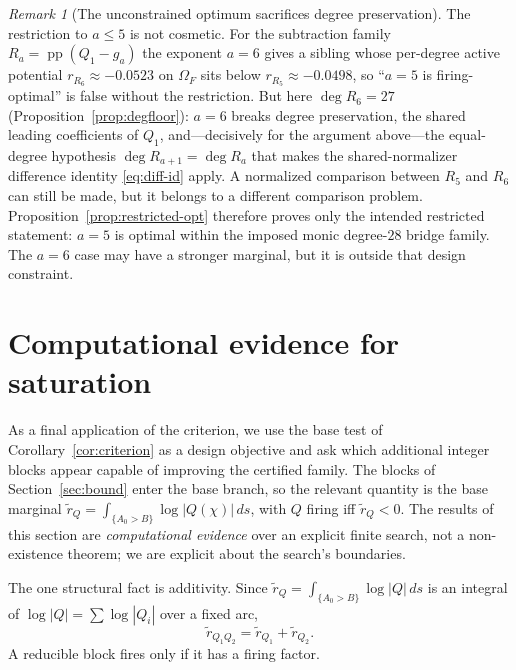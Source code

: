 \documentclass[11pt,reqno]{amsart}
\theoremstyle{plain}
\theoremstyle{definition}
\theoremstyle{remark}
\newtheorem{remark}[theorem]{Remark}
\DeclareMathOperator{\pp}{pp}
\newcommand{\rb}[1]{r_{#1}}   %
\begin{document}
\begin{remark}[The unconstrained optimum sacrifices degree preservation]
\label{rem:a6}
The restriction to $a\le5$ is not cosmetic. For the subtraction family
$R_a=\pp(Q_1-g_a)$ the exponent $a=6$ gives a sibling whose per-degree active potential
$\rb{R_6}\approx-0.0523$ on $\Omega_F$ sits below $\rb{R_5}\approx-0.0498$, so ``$a=5$ is
firing-optimal'' is false without the restriction. But here
$\deg R_6=27$ (Proposition~\ref{prop:degfloor}): $a=6$ breaks degree preservation, the
shared leading coefficients of $Q_1$, and---decisively for the argument
above---the equal-degree hypothesis $\deg R_{a+1}=\deg R_a$ that makes the
shared-normalizer difference identity \eqref{eq:diff-id} apply.  A normalized comparison
between $R_5$ and $R_6$ can still be made, but it belongs to a different comparison
problem.  Proposition~\ref{prop:restricted-opt} therefore proves only the intended
restricted statement: $a=5$ is optimal within the imposed monic degree-$28$ bridge
family.  The $a=6$ case may have a stronger marginal, but it is outside that design
constraint.
\end{remark}

\section{Computational evidence for saturation}\label{sec:saturation}

As a final application of the criterion, we use the base test of
Corollary~\ref{cor:criterion} as a design objective and ask which additional integer
blocks appear capable of improving the certified family. The blocks of
Section~\ref{sec:bound} enter the base branch, so the relevant quantity is the base marginal
$\widetilde r_Q=\int_{\{A_0>B\}}\log|Q(\chi)|\,ds$, with $Q$ firing iff
$\widetilde r_Q<0$. The results of this section are \emph{computational evidence} over
an explicit finite search, not a non-existence theorem; we are explicit about the
search's boundaries.

The one structural fact is additivity. Since
$\widetilde r_Q=\int_{\{A_0>B\}}\log|Q|\,ds$ is an integral of $\log|Q|=\sum\log|Q_i|$
over a fixed arc,
\begin{equation}\label{eq:additive}
  \widetilde r_{Q_1Q_2}=\widetilde r_{Q_1}+\widetilde r_{Q_2}.
\end{equation}
A reducible block fires only if it has a firing factor.
\end{document}

